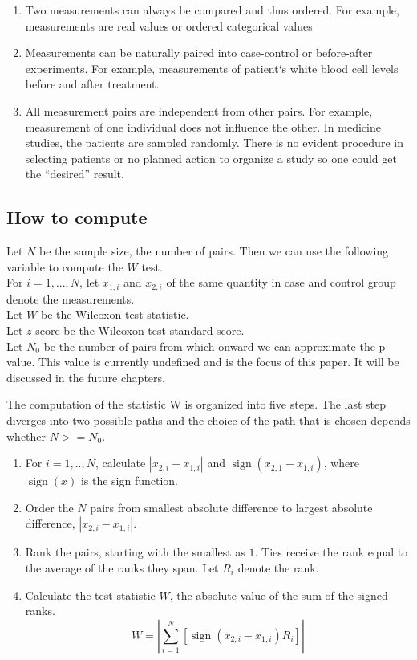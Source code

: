 \documentclass[12pt]{article}
\DeclareMathOperator{\sign}{sign}
\begin{document}
{\begin{enumerate}
  \item Two measurements can always be compared and thus ordered. For example, measurements are real values or ordered categorical values
  \item Measurements can be naturally paired into case-control or before-after experiments. For example, measurements of patient`s white blood cell levels before and after treatment.
  \item All measurement pairs are independent from other pairs. For example, measurement of one individual does not influence the other. In medicine studies, the patients are sampled randomly. There is no evident procedure in selecting patients or no planned action to organize a study so one could get the ``desired'' result.
\end{enumerate}

\subsection{How to compute}
Let $N$ be the sample size, the number of pairs. Then we can use the following variable to compute the $W$ test. \\For $i=1,...,N$, let $x_{1, i}$ and $x_{2, i}$ of the same quantity in case and control group denote the measurements. \\
Let $W$ be the Wilcoxon test statistic. \\
Let $z$-score be the Wilcoxon test standard score. \\
Let $N_0$ be the number of pairs from which onward we can approximate the p-value. This value is currently undefined and is the focus of this paper. It will be discussed in the future chapters.

The computation of the statistic W is organized into five steps. The last step diverges into two possible paths and the choice of the path that is chosen depends whether $N  >= N_0$.

\begin{enumerate}
\item
For $i=1, .., N$, calculate $|x_{2,i} - x_{1,i}|$ and $\sign(x_{2,1} - x_{1,i})$, where $\sign(x)$ is the sign function.
\item
Order the $N$ pairs from smallest absolute difference to largest absolute difference, $|x_{2,i} - x_{1,i}|$.
\item
Rank the pairs, starting with the smallest as $1$. Ties receive the rank equal to the average of the ranks they span. Let $R_i$ denote the rank.
\item
Calculate the test statistic $W$, the absolute value of the sum of the signed ranks.
\begin{equation}
  W= \left|  \sum\limits_{i=1}^{N} \left[ \sign(x_{2,i} - x_{1,i})R_i \right] \right|
\end{equation}


\end{enumerate}}
\end{document}
